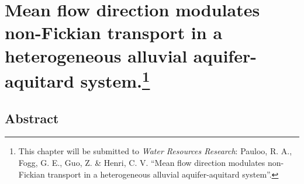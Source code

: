 
\chapter[Mean flow direction modulates non-Fickian transport in a heterogeneous alluvial aquifer-aquitard system]{Mean flow direction modulates non-Fickian transport in a heterogeneous alluvial aquifer-aquitard system.\footnote[1]{This chapter will be submitted to \textit{Water Resources Research}: Pauloo, R. A., Fogg, G. E., Guo, Z. \& Henri, C. V. ``Mean flow direction modulates non-Fickian transport in a heterogeneous alluvial aquifer-aquitard system''.}}

\section{Abstract}

